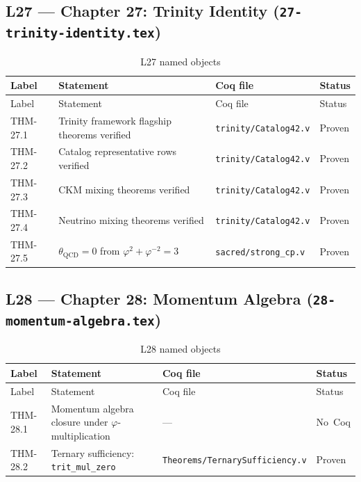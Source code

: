 \subsection{L27 — Chapter 27: Trinity Identity
  (\texttt{27-trinity-identity.tex})}
\label{sec:A-L27}

\begin{longtable}{lp{6cm}ll}
\toprule
Label & Statement & Coq file & Status \\
\midrule
\endfirsthead
\toprule
Label & Statement & Coq file & Status \\
\midrule
\endhead
\bottomrule
\endfoot
\bottomrule
\caption{L27 named objects}
\endlastfoot
THM-27.1 & Trinity framework flagship theorems verified &
  \texttt{trinity/Catalog42.v} & Proven \\
THM-27.2 & Catalog representative rows verified &
  \texttt{trinity/Catalog42.v} & Proven \\
THM-27.3 & CKM mixing theorems verified &
  \texttt{trinity/Catalog42.v} & Proven \\
THM-27.4 & Neutrino mixing theorems verified &
  \texttt{trinity/Catalog42.v} & Proven \\
THM-27.5 & $\theta_{\text{QCD}} = 0$ from
  $\varphi^{2}+\varphi^{-2}=3$ &
  \texttt{sacred/strong\_cp.v} & Proven \\
\end{longtable}

\subsection{L28 — Chapter 28: Momentum Algebra
  (\texttt{28-momentum-algebra.tex})}
\label{sec:A-L28}

\begin{longtable}{lp{6cm}ll}
\toprule
Label & Statement & Coq file & Status \\
\midrule
\endfirsthead
\toprule
Label & Statement & Coq file & Status \\
\midrule
\endhead
\bottomrule
\endfoot
\bottomrule
\caption{L28 named objects}
\endlastfoot
THM-28.1 &
  Momentum algebra closure under $\varphi$-multiplication & --- & No~Coq \\
THM-28.2 & Ternary sufficiency: \texttt{trit\_mul\_zero} &
  \texttt{Theorems/TernarySufficiency.v} & Proven \\
\end{longtable}

